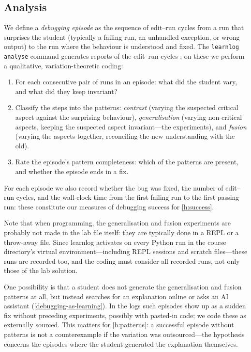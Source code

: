 \subsection{Analysis}
\label{analysis}

We define a \emph{debugging episode} as the sequence of edit--run cycles from
a run that surprises the student (typically a failing run, an unhandled
exception, or wrong output) to the run where the behaviour is understood and
fixed.
The \texttt{learnlog analyse} command generates reports of the edit--run
cycles \autocite{learnlog}; on these we perform a qualitative,
variation-theoretic coding:\label{episode-coding}

\begin{frame}
\begin{enumerate}
  \item For each consecutive pair of runs in an episode: what did the student
    vary, and what did they keep invariant?
  \item Classify the steps into the patterns: \emph{contrast} (varying the
    suspected critical aspect against the surprising behaviour),
    \emph{generalisation} (varying non-critical aspects, keeping the suspected
    aspect invariant---the experiments), and \emph{fusion} (varying the
    aspects together, reconciling the new understanding with the old).
  \item Rate the episode's pattern completeness: which of the patterns are
    present, and whether the episode ends in a fix.
\end{enumerate}
For each episode we also record whether the bug was fixed, the number of
edit--run cycles, and the wall-clock time from the first failing run to
the first passing run: these constitute our measures of debugging success
for \cref{h:success}.
\end{frame}

Note that when programming, the generalisation and fusion experiments are
probably not made in the lab file itself: they are typically done in a REPL
or a throw-away file.
Since learnlog activates on every Python run in the course directory's
virtual environment---including REPL sessions and scratch files---these
runs are recorded too, and the coding must consider all recorded runs, not
only those of the lab solution.

One possibility is that a student does not generate the generalisation and
fusion patterns at all, but instead searches for an explanation online or
asks an AI assistant (\cref{debugging-as-learning}).
In the logs such episodes show up as a sudden fix without preceding
experiments, possibly with pasted-in code; we code these as externally
sourced.
This matters for \cref{h:patterns}: a successful episode without patterns
is not a counterexample if the variation was outsourced---the hypothesis
concerns the episodes where the student generated the explanation
themselves.

